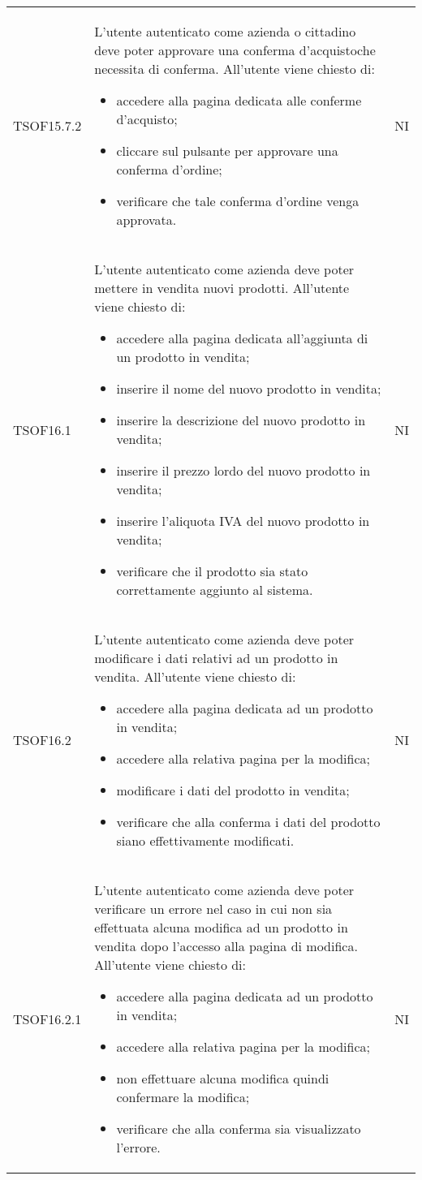 \begin{longtable}{ >{\centering}p{} >{\centering}p{}
			>{\centering}p{}}
		TSOF15.7.2	&	L'utente autenticato come azienda o cittadino deve poter approvare una conferma d’acquisto\glosp che necessita
		di conferma. All'utente viene chiesto di:
		\begin{itemize}
			\item accedere alla pagina dedicata alle conferme d'acquisto;
			\item cliccare sul pulsante per approvare una conferma d'ordine;
			\item verificare che tale conferma d'ordine venga approvata.
		\end{itemize}	&	NI
	
		\tabularnewline
		TSOF16.1	&	L'utente autenticato come azienda deve poter mettere in vendita nuovi
		prodotti. All'utente viene chiesto di:
		\begin{itemize}
			\item accedere alla pagina dedicata all'aggiunta di un prodotto in
			vendita;
			\item inserire il nome del nuovo prodotto in vendita;
			\item inserire la descrizione del nuovo prodotto in vendita;
			\item inserire il prezzo lordo\glo{} del nuovo prodotto in vendita;
			\item inserire l'aliquota IVA del nuovo prodotto in vendita;
			\item verificare che il prodotto sia stato correttamente aggiunto al sistema.
		\end{itemize}	&	NI
		\tabularnewline
		
		TSOF16.2	&	L'utente autenticato come azienda deve poter modificare i dati relativi ad
		un prodotto in vendita. All'utente viene chiesto di:
		\begin{itemize}
			\item accedere alla pagina dedicata ad un prodotto in vendita;
			\item accedere alla relativa pagina per la modifica;
			\item modificare i dati del prodotto in vendita;
			\item verificare che alla conferma i dati del prodotto siano effettivamente
			modificati.
		\end{itemize}	&	NI
	
		\tabularnewline
		TSOF16.2.1	&	L'utente autenticato come azienda deve poter verificare un errore nel caso
		in cui non sia effettuata alcuna modifica ad un prodotto in vendita dopo
		l'accesso alla pagina di modifica. All'utente viene chiesto di:
		\begin{itemize}
			\item accedere alla pagina dedicata ad un prodotto in vendita;
			\item accedere alla relativa pagina per la modifica;
			\item non effettuare alcuna modifica quindi confermare la modifica;
			\item verificare che alla conferma sia visualizzato l'errore.
		\end{itemize}	&	NI
	

\end{longtable}
